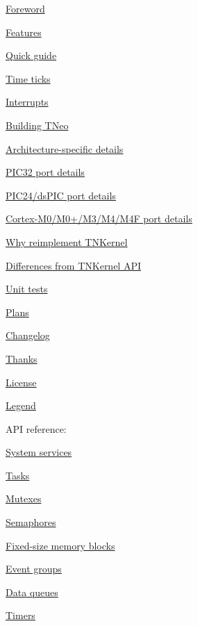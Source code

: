\begin{DoxyItemize}
\item \hyperlink{foreword}{Foreword}
\item \hyperlink{features}{Features}
\item \hyperlink{quick_guide}{Quick guide}
\item \hyperlink{time_ticks}{Time ticks}
\item \hyperlink{interrupts}{Interrupts}
\item \hyperlink{building}{Building T\+Neo}
\item \hyperlink{arch_specific}{Architecture-\/specific details}
\begin{DoxyItemize}
\item \hyperlink{arch_specific_pic32_details}{P\+I\+C32 port details}
\item \hyperlink{arch_specific_pic24_details}{P\+I\+C24/ds\+P\+I\+C port details}
\item \hyperlink{arch_specific_cortex_m_details}{Cortex-\/\+M0/\+M0+/\+M3/\+M4/\+M4\+F port details}
\end{DoxyItemize}
\item \hyperlink{why_reimplement}{Why reimplement T\+N\+Kernel}
\item \hyperlink{tnkernel_diff}{Differences from T\+N\+Kernel A\+P\+I}
\item \hyperlink{unit_tests}{Unit tests}
\item \hyperlink{plans}{Plans}
\item \hyperlink{changelog}{Changelog}
\item \hyperlink{thanks}{Thanks}
\item \hyperlink{license}{License}
\item \hyperlink{legend}{Legend}
\end{DoxyItemize}

A\+P\+I reference\+:


\begin{DoxyItemize}
\item \hyperlink{tn__sys_8h}{System services}
\item \hyperlink{tn__tasks_8h}{Tasks}
\item \hyperlink{tn__mutex_8h}{Mutexes}
\item \hyperlink{tn__sem_8h}{Semaphores}
\item \hyperlink{tn__fmem_8h}{Fixed-\/size memory blocks}
\item \hyperlink{tn__eventgrp_8h}{Event groups}
\item \hyperlink{tn__dqueue_8h}{Data queues}
\item \hyperlink{tn__timer_8h}{Timers} 
\end{DoxyItemize}